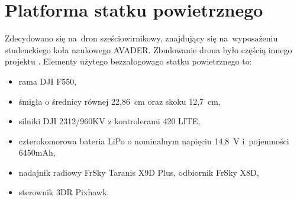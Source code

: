\section{Platforma statku powietrznego}
\label{sec:platforma_statku_powietrznego}
Zdecydowano się na~dron sześciowirnikowy, znajdujący się na~wyposażeniu studenckiego koła naukowego AVADER. Zbudowanie drona było częścią innego projektu \cite{mgr}. Elementy użytego bezzałogowago statku powietrznego to:
\begin{itemize}
	\item rama DJI F550,
	\item śmigła o średnicy równej 22,86~cm oraz skoku 12,7~cm,
	\item silniki DJI 2312/960KV z kontrolerami 420 LITE,
	\item czterokomorowa bateria LiPo o nominalnym napięciu 14,8~V i~pojemności 6450mAh, 
	\item nadajnik radiowy FrSky Taranis X9D Plus, odbiornik FrSky X8D,
	\item sterownik 3DR Pixhawk.
\end{itemize}

